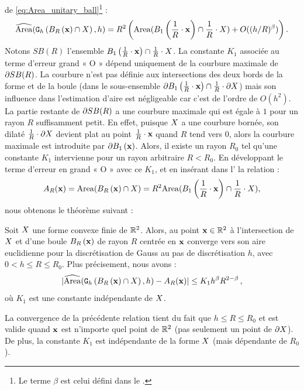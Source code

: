 de \ref{eq:Area_unitary_ball}\footnote{Le terme $\beta$ est celui défini dans le .} :
\begin{equation}
  \label{eq:Area_unitary_ball_shape}
  \AreaC(\DigF{\Ball{R}{\vx} \cap \Shape}{h}, h) = R^2 \left(\Area( \Ball{1}{\frac{1}{R} \cdot \vx} \cap \frac{1}{R} \cdot \Shape) + O( (h/R)^\beta) \right).
\end{equation}
%
Notons $SB(R)$ l'ensemble $\Ball{1}{\frac{1}{R} \cdot \vx} \cap \frac{1}{R}
\cdot \Shape$. La constante $K_1$ associée au terme d'erreur grand « O » dépend
uniquement de la courbure maximale de $\BT SB(R)$. La courbure n'est pas définie
aux intersections des deux bords de la forme et de la boule (dans le
sous-ensemble $\BT \Ball{1}{\frac{1}{R} \cdot \vx} \cap \frac{1}{R} \cdot \dS$)
mais son influence dans l'estimation d'aire est négligeable car c'est de l'ordre
de $O(h^2)$. La partie restante de $\BT SB(R)$ a une courbure maximale qui est
égale à $1$ pour un rayon $R$ suffisamment petit. En effet, puisque $\Shape$ a
une courbure bornée, son dilaté $\frac{1}{R} \cdot \dS$ devient plat au point
$\frac{1}{R} \cdot \vx$ quand $R$ tend vers $0$, alors la courbure maximale est
introduite par $\BT \Ball{1}{\vx}$. Alors, il existe un rayon $R_0$ tel qu'une
constante $K_1$ intervienne pour un rayon arbitraire $R < R_0$. En développant
le terme d'erreur en grand « O » avec ce $K_1$, et en insérant dans
l' la relation :
%
\begin{equation}
  A_R(\vx) = \Area( \Ball{R}{\vx} \cap \Shape ) = R^2 \Area( \Ball{1}{\frac{1}{R} \cdot \vx} \cap \frac{1}{R} \cdot \Shape),
\end{equation}
%
nous obtenons le théorème suivant :
%
\begin{theorem}{}
  \label{thm:convergence-area-intersection}
  Soit $\Shape$ une forme convexe finie de $\R^2$. Alors,  au point $\vx \in \R^2$ à l'intersection de $\Shape$ et
  d'une boule $\Ball{R}{\vx}$ de rayon $R$ centrée en $\vx$ converge vers son
  aire euclidienne pour la discrétisation de Gauss au pas de discrétisation $h$,
  avec $0 < h \le R \le R_0$. Plus précisement, nous avons :
  \begin{equation}\label{eq:convergence-area-intersection}
    | \AreaC(\DigF{\Ball{R}{\vx} \cap \Shape}{h}, h) - A_R(\vx) | \le K_1 h^\beta R^{2-\beta} \,,
  \end{equation}
  où $K_1$ est une constante indépendante de $\Shape$.
\end{theorem}
%
La convergence de la précédente relation tient du fait que $h \le R \le R_0$ et
est valide quand $\vx$ est n'importe quel point de $\R^2$ (pas seulement un
point de $\dS$). De plus, la constante $K_1$ est indépendante de la forme
$\Shape$ (mais dépendante de $R_0$).

